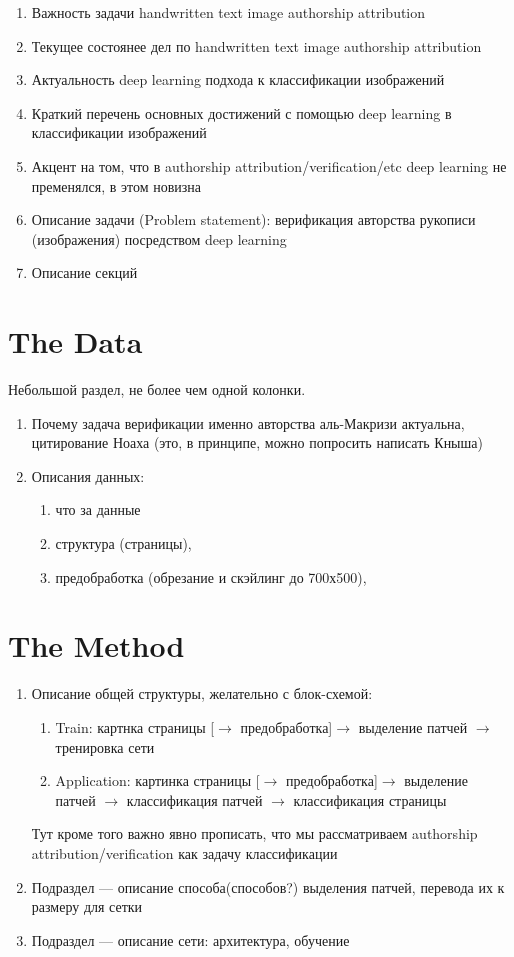 \documentclass[conference,a4paper,twocolumn]{IEEEtran}
\begin{document}
\begin{enumerate}
	\item Важность задачи handwritten text image authorship attribution
	\item Текущее состоянее дел по handwritten text image authorship attribution 
	\item Актуальность deep learning подхода к классификации изображений
	\item Краткий перечень основных достижений с помощью deep learning в классификации изображений
	\item Акцент на том, что в authorship attribution/verification/etc deep learning не пременялся, в этом новизна
	\item Описание задачи (Problem statement): верификация авторства рукописи (изображения) посредством deep learning
	\item Описание секций
\end{enumerate}

\section{The Data}
Небольшой раздел, не более чем одной колонки.
\begin{enumerate}
	\item Почему задача верификации именно авторства аль-Макризи актуальна, цитирование Ноаха (это, в принципе, можно попросить написать Кныша)
	\item Описания данных: 
	\begin{enumerate}
		\item что за данные
		\item структура (страницы), 
		\item предобработка (обрезание и скэйлинг до 700х500), 
	\end{enumerate}
\end{enumerate}


\section{The Method}
\begin{enumerate}
	\item Описание общей структуры, желательно с блок-схемой: 
		\begin{enumerate}
			 \item Train: картнка страницы [$\to$  предобработка]$\to$ выделение патчей $\to$ тренировка сети
			 \item Application: картинка страницы [$\to$  предобработка]$\to$ выделение патчей $\to$ классификация патчей $\to$ классификация страницы
		\end{enumerate}
	Тут кроме того важно явно прописать, что мы рассматриваем authorship attribution/verification как задачу классификации
	\item Подраздел --- описание способа(способов?) выделения патчей, перевода их к размеру для сетки
	\item Подраздел --- описание сети: архитектура, обучение
\end{enumerate}
\end{document}
